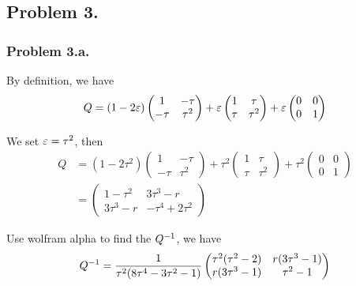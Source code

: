 

\newpage
\subsection*{Problem 3.}

\subsubsection*{Problem 3.a.}

By definition, we have
\begin{align*}
  Q =  (1-2\varepsilon)\begin{pmatrix}
    1 & -\tau \\
    -\tau & \tau^2
  \end{pmatrix}
            + \varepsilon \begin{pmatrix}
              1 & \tau \\
              \tau & \tau^2
            \end{pmatrix}
                     + \varepsilon \begin{pmatrix}
                       0 & 0 \\
                       0 & 1
                     \end{pmatrix}
\end{align*}

We set $\varepsilon = \tau^2$, then
\begin{align*}
  Q &=  (1-2\tau^2)\begin{pmatrix}
    1 & -\tau \\
    -\tau & \tau^2
  \end{pmatrix}
            + \tau^2 \begin{pmatrix}
              1 & \tau \\
              \tau & \tau^2
            \end{pmatrix}
                     + \tau^2 \begin{pmatrix}
                       0 & 0 \\
                       0 & 1
                     \end{pmatrix} \\
    &= \begin{pmatrix}
      1-\tau^2 & 3\tau^3 - r \\
      3\tau^3 - r & -\tau^4 + 2\tau^2
    \end{pmatrix}
\end{align*}

Use wolfram alpha to find the $Q^{-1}$, we have
\begin{align*}
  Q^{-1} = \frac{1}{\tau^2(8\tau^4 - 3\tau^2 -1)} \begin{pmatrix}
    \tau^2(\tau^2 - 2) & r(3\tau^3 - 1) \\
    r(3\tau^3 - 1) & \tau^2 -  1
  \end{pmatrix}
\end{align*}

